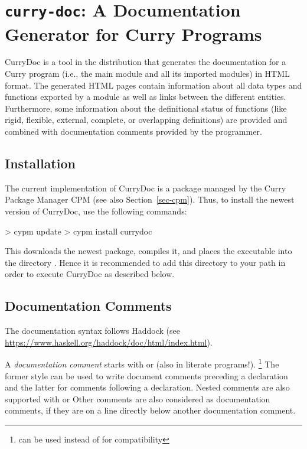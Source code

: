 \section{\texttt{curry-doc}: A Documentation Generator for Curry Programs}

CurryDoc%
is a tool in the \CYS distribution that generates
the documentation for a Curry program (i.e., the main module
and all its imported modules) in HTML format.
The generated HTML pages contain information about
all data types and functions exported by a module as well
as links between the different entities.
Furthermore, some information about the definitional status
of functions (like rigid, flexible, external, complete, or
overlapping definitions) are provided and combined with
documentation comments provided by the programmer.

\subsection{Installation}

The current implementation of CurryDoc is a package
managed by the Curry Package Manager CPM
(see also Section~\ref{sec-cpm}).
Thus, to install the newest version of CurryDoc, use the following commands:
%
\begin{curry}
> cypm update
> cypm install currydoc
\end{curry}
%
This downloads the newest package, compiles it, and places
the executable  into the directory .
Hence it is recommended to add this directory to your path
in order to execute CurryDoc as described below.

\subsection{Documentation Comments}

The documentation syntax follows Haddock
(see \url{https://www.haskell.org/haddock/doc/html/index.html}).

A \emph{documentation comment}%
starts
with \ccode{-- | } or \ccode{-- \^} (also in literate programs!).
\footnote{\ccode{---} can be used instead of \ccode{-- | } for compatibility}
The former style can be used to write document comments preceding a declaration
and the latter for comments following a declaration.
Nested comments are also supported with  \ccode{\{- | } or \ccode{\{- \^}
Other comments are also considered as documentation comments, if they are
on a line directly below another documentation comment.

